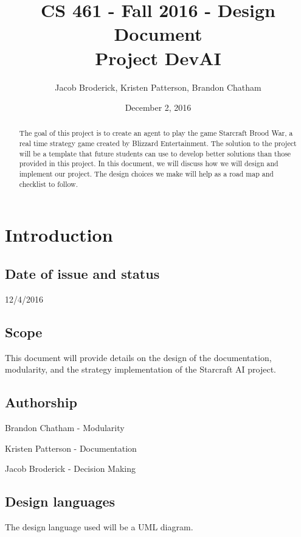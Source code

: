 

\begin{titlepage}

  \title{CS 461 - Fall 2016 - Design Document \\ Project DevAI}
  \author{Jacob Broderick, Kristen Patterson, Brandon Chatham}
  \date{December 2, 2016}
  \maketitle
  \vspace{4cm}
  \begin{abstract}
  	\noindent 
  	  	\noindent
	The goal of this project is to create an agent to play the game Starcraft Brood War, a real time strategy game created by Blizzard Entertainment. The solution to the project will be a template that future students can use to develop better solutions than those provided in this project. In this document, we will discuss how we will design and implement our project. The design choices we make will help as a road map and checklist to follow.
   \end{abstract}
\end{titlepage}



\section{Introduction}
\subsection{Date of issue and status}
12/4/2016
\subsection{Scope}
	This document will provide details on the design of the documentation, modularity, and the strategy implementation of the Starcraft AI project.
	
\subsection{Authorship}
Brandon Chatham - Modularity

Kristen Patterson - Documentation

Jacob Broderick - Decision Making
\subsection{Design languages}
	The design language used will be a UML diagram.

